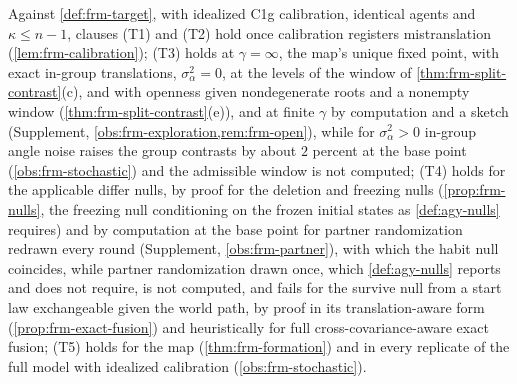 Against \cref{def:frm-target}, with idealized C1g calibration, identical agents and $\kappa\le n-1$, clauses (T1) and (T2) hold once calibration registers mistranslation (\cref{lem:frm-calibration}); (T3) holds at $\gamma=\infty$, the map's unique fixed point, with exact in-group translations, $\sigma_\alpha^2=0$, at the levels of the window of \cref{thm:frm-split-contrast}(c), and with openness given nondegenerate roots and a nonempty window (\cref{thm:frm-split-contrast}(e)), and at finite $\gamma$ by computation and a sketch (Supplement, \cref{obs:frm-exploration,rem:frm-open}), while for $\sigma_\alpha^2>0$ in-group angle noise raises the group contrasts by about $2$ percent at the base point (\cref{obs:frm-stochastic}) and the admissible window is not computed; (T4) holds for the applicable differ nulls, by proof for the deletion and freezing nulls (\cref{prop:frm-nulls}, the freezing null conditioning on the frozen initial states as \cref{def:agy-nulls} requires) and by computation at the base point for partner randomization redrawn every round (Supplement, \cref{obs:frm-partner}), with which the habit null coincides, while partner randomization drawn once, which \cref{def:agy-nulls} reports and does not require, is not computed, and fails for the survive null from a start law exchangeable given the world path, by proof in its translation-aware form (\cref{prop:frm-exact-fusion}) and heuristically for full cross-covariance-aware exact fusion; (T5) holds for the map (\cref{thm:frm-formation}) and in every replicate of the full model with idealized calibration (\cref{obs:frm-stochastic}).

